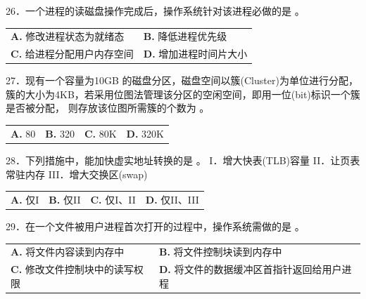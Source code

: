 \documentclass[UTF8,11pt]{ctexart}
\begin{document}
26．一个进程的读磁盘操作完成后，操作系统针对该进程必做的是 。


\begin{center}\begin{tabular}{>{\raggedright\arraybackslash}p{\dimexpr(\linewidth-4\tabcolsep)/2\relax}>{\raggedright\arraybackslash}p{\dimexpr(\linewidth-4\tabcolsep)/2\relax}}
\textbf{A.} 修改进程状态为就绪态 & \textbf{B.} 降低进程优先级\\[.35em]
\textbf{C.} 给进程分配用户内存空间 & \textbf{D.} 增加进程时间片大小\\[.35em]\end{tabular}\end{center}

27．现有一个容量为10GB 的磁盘分区，磁盘空间以簇(Cluster)为单位进行分配，簇的大小为4KB，若采用位图法管理该分区的空闲空间，即用一位(bit)标识一个簇是否被分配， 则存放该位图所需簇的个数为 。


\begin{center}\begin{tabular}{>{\raggedright\arraybackslash}p{\dimexpr(\linewidth-8\tabcolsep)/4\relax}>{\raggedright\arraybackslash}p{\dimexpr(\linewidth-8\tabcolsep)/4\relax}>{\raggedright\arraybackslash}p{\dimexpr(\linewidth-8\tabcolsep)/4\relax}>{\raggedright\arraybackslash}p{\dimexpr(\linewidth-8\tabcolsep)/4\relax}}
\textbf{A.} 80 & \textbf{B.} 320 & \textbf{C.} 80K & \textbf{D.} 320K\\[.35em]\end{tabular}\end{center}

28．下列措施中，能加快虚实地址转换的是 。 I．增大快表(TLB)容量 II．让页表常驻内存 III．增大交换区(swap)


\begin{center}\begin{tabular}{>{\raggedright\arraybackslash}p{\dimexpr(\linewidth-8\tabcolsep)/4\relax}>{\raggedright\arraybackslash}p{\dimexpr(\linewidth-8\tabcolsep)/4\relax}>{\raggedright\arraybackslash}p{\dimexpr(\linewidth-8\tabcolsep)/4\relax}>{\raggedright\arraybackslash}p{\dimexpr(\linewidth-8\tabcolsep)/4\relax}}
\textbf{A.} 仅I & \textbf{B.} 仅II & \textbf{C.} 仅I、II & \textbf{D.} 仅II、III\\[.35em]\end{tabular}\end{center}

29．在一个文件被用户进程首次打开的过程中，操作系统需做的是 。


\begin{center}\begin{tabular}{>{\raggedright\arraybackslash}p{\dimexpr(\linewidth-4\tabcolsep)/2\relax}>{\raggedright\arraybackslash}p{\dimexpr(\linewidth-4\tabcolsep)/2\relax}}
\textbf{A.} 将文件内容读到内存中 & \textbf{B.} 将文件控制块读到内存中\\[.35em]
\textbf{C.} 修改文件控制块中的读写权限 & \textbf{D.} 将文件的数据缓冲区首指针返回给用户进程\\[.35em]\end{tabular}\end{center}
\end{document}
